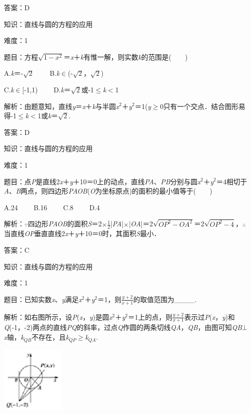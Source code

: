 \documentclass{article} %
\begin{document}
答案：D

知识：直线与圆的方程的应用

难度：1

题目：方程$\sqrt{1-x^2}$＝\textit{x}＋\textit{k}有惟一解，则实数\textit{k}的范围是(　　)

A.\textit{k}＝-$\sqrt{2}$　　  B.\textit{k}$\mathrm{\in}$(-$\sqrt{2}$，$\sqrt{2}$)

C.\textit{k}$\mathrm{\in}$[-1,1)　　  D.\textit{k}＝$\sqrt{2}$或-1$\mathrm{\le}$\textit{k}$\mathrm{<}$1

解析：由题意知，直线\textit{y}＝\textit{x}＋\textit{k}与半圆\textit{x}${}^{2}$＋\textit{y}${}^{2}$＝1(\textit{y}$\mathrm{\ge}$0只有一个交点．结合图形易得-1$\mathrm{\le}$\textit{k}$\mathrm{<}$1或\textit{k}＝$\sqrt{2}$.

答案：D

知识：直线与圆的方程的应用

难度：1

题目：点\textit{P}是直线2\textit{x}＋\textit{y}＋10＝0上的动点，直线\textit{PA}、\textit{PB}分别与圆\textit{x}${}^{2}$＋\textit{y}${}^{2}$＝4相切于\textit{A}、\textit{B}两点，则四边形\textit{PAOB}(\textit{O}为坐标原点)的面积的最小值等于(　　)

A.24　　 B.16　　 C.8　　 D.4

解析：$\mathrm{\because}$四边形\textit{PAOB}的面积\textit{S}＝2$\mathrm{\times}$$\frac{1}{2}$|\textit{PA}|$\mathrm{\times}$|\textit{OA}|＝2$\sqrt{OP^2-OA^2}$＝2$\sqrt{OP^2-4}$，$\mathrm{\therefore}$当直线\textit{OP}垂直直线2\textit{x}＋\textit{y}＋10＝0时，其面积\textit{S}最小．

答案：C


知识：直线与圆的方程的应用

难度：1

题目：已知实数\textit{x}、\textit{y}满足\textit{x}${}^{2}$＋\textit{y}${}^{2}$＝1，则$\frac{y+2}{x+1}$的取值范围为\_\_\_\_.

解析：如右图所示，设\textit{P}(\textit{x}，\textit{y})是圆\textit{x}${}^{2}$＋\textit{y}${}^{2}$＝1上的点，则$\frac{y+2}{x+1}$表示过\textit{P}(\textit{x}，\textit{y})和\textit{Q}(-1，-2)两点的直线\textit{PQ}的斜率，过点\textit{Q}作圆的两条切线\textit{QA}，\textit{QB}，由图可知\textit{QB}$\mathrm{\bot}$\textit{x}轴，\textit{k${}_{QB}$}不存在，且\textit{k${}_{QP}$}$\mathrm{\ge}$\textit{k${}_{QA}$}.

\includegraphics*[width=1.23in, height=1.30in, keepaspectratio=false]{image300}
\end{document}
